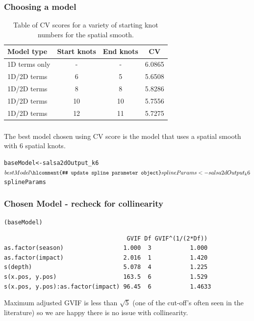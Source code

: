 \begin{frame}[fragile]
\frametitle{Choosing a model}
\begin{table}[h]
\centering
\caption{Table of CV scores for a variety of starting knot numbers for the spatial smooth.}
\begin{tabular}{l|c|c|c}
\textbf{Model type} & \textbf{Start knots} & \textbf{End knots}  & \textbf{CV}\\
\hline
1D terms only & - & - & 6.0865\\
1D/2D terms & 6 & 5 & 5.6508\\
1D/2D terms & 8 & 8  & 5.8286\\
1D/2D terms & 10 & 10  & 5.7556\\
1D/2D terms & 12 & 11  & 5.7275\\
\end{tabular}
\label{tab:fitstats}
\end{table}
\end{frame}

\begin{frame}[fragile]
\frametitle{}
The best model chosen using CV score is the model that uses a spatial smooth with 6 spatial knots.
\begin{knitrout}\footnotesize
{}\color{fgcolor}\begin{kframe}
\begin{alltt}
baseModel <- salsa2dOutput_k6$bestModel
\hlcomment{# update spline parameter object}
splineParams <- salsa2dOutput_k6$splineParams
\end{alltt}
\end{kframe}
\end{knitrout}

\end{frame}

\begin{frame}[fragile]
\frametitle{Chosen Model - recheck for collinearity}
\begin{knitrout}\footnotesize
{}\color{fgcolor}\begin{kframe}
\begin{alltt}
(baseModel)
\end{alltt}
\begin{verbatim}
                                   GVIF Df GVIF^(1/(2*Df))
as.factor(season)                 1.000  3           1.000
as.factor(impact)                 2.016  1           1.420
s(depth)                          5.078  4           1.225
s(x.pos, y.pos)                   163.5  6           1.529
s(x.pos, y.pos):as.factor(impact) 96.45  6           1.4633
\end{verbatim}
\end{kframe}
\end{knitrout}
\begin{block}{}
Maximum adjusted GVIF is less than $\sqrt{5}$ (one of the cut-off's often seen in the literature) so we are happy there is no issue with collinearity.
\end{block}
\end{frame}

